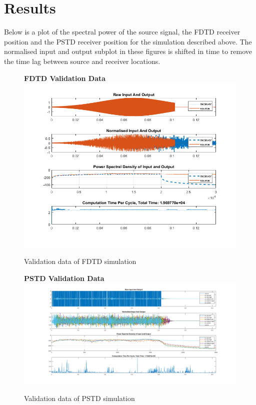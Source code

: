 \section{Results}
Below is a plot of the spectral power of the source signal, the FDTD receiver position and the PSTD receiver position for the simulation described above. The normalised input and output subplot in these figures is shifted in time to remove the time lag between source and receiver locations.

\begin{figure}[H]
\centering
\textbf{FDTD Validation Data}
  \includegraphics[width=\textwidth]{./graphics/FDTDvalidationFinal.png}
  \caption{Validation data of FDTD simulation}
\end{figure}

\begin{figure}[H]
\centering
\textbf{PSTD Validation Data}
  \includegraphics[width=\textwidth]{./graphics/PSTDvalidationFinal.png}
  \caption{Validation data of PSTD simulation}
\end{figure}

